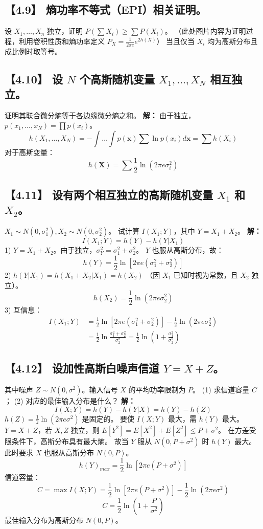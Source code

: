 \documentclass[11pt, a4paper]{article}
\begin{document}
\subsection*{【4.9】 熵功率不等式（EPI）相关证明。}
设 $X_1, \dots, X_n$ 独立，证明 $P(\sum X_i) \ge \sum P(X_i)$。
（此处图片内容为证明过程，利用卷积性质和熵功率定义 $P_X = \frac{1}{2\pi e} e^{2h(X)}$）
当且仅当 $X_i$ 均为高斯分布且成比例时取等号。

\subsection*{【4.10】 设 $N$ 个高斯随机变量 $X_1, \dots, X_N$ 相互独立。}
证明其联合微分熵等于各边缘微分熵之和。
\textbf{解：}
由于独立，$p(x_1, \dots, x_N) = \prod p(x_i)$。
\[ h(X_1, \dots, X_N) = - \int \dots \int p(\mathbf{x}) \sum \ln p(x_i) d\mathbf{x} = \sum h(X_i) \]
对于高斯变量：
\[ h(\mathbf{X}) = \sum \frac{1}{2} \ln(2\pi e \sigma_i^2) \]

\subsection*{【4.11】 设有两个相互独立的高斯随机变量 $X_1$ 和 $X_2$。}
$X_1 \sim N(0, \sigma_1^2), X_2 \sim N(0, \sigma_2^2)$。
试计算 $I(X_1; Y)$，其中 $Y = X_1 + X_2$。
\textbf{解：}
\[ I(X_1; Y) = h(Y) - h(Y|X_1) \]
1) $Y = X_1 + X_2$。由于独立，$\sigma_Y^2 = \sigma_1^2 + \sigma_2^2$。
$Y$ 也服从高斯分布，故：
\[ h(Y) = \frac{1}{2} \ln [2\pi e (\sigma_1^2 + \sigma_2^2)] \]
2) $h(Y|X_1) = h(X_1 + X_2 | X_1) = h(X_2)$ （因 $X_1$ 已知时视为常数，且 $X_2$ 独立）。
\[ h(X_2) = \frac{1}{2} \ln (2\pi e \sigma_2^2) \]
3) 互信息：
\[
\begin{aligned}
I(X_1; Y) &= \frac{1}{2} \ln [2\pi e (\sigma_1^2 + \sigma_2^2)] - \frac{1}{2} \ln (2\pi e \sigma_2^2) \\
&= \frac{1}{2} \ln \frac{\sigma_1^2 + \sigma_2^2}{\sigma_2^2} = \frac{1}{2} \ln \left( 1 + \frac{\sigma_1^2}{\sigma_2^2} \right)
\end{aligned}
\]

\subsection*{【4.12】 设加性高斯白噪声信道 $Y = X + Z$。}
其中噪声 $Z \sim N(0, \sigma^2)$。输入信号 $X$ 的平均功率限制为 $P$。
(1) 求信道容量 $C$；
(2) 对应的最佳输入分布是什么？
\textbf{解：}
\[ I(X;Y) = h(Y) - h(Y|X) = h(Y) - h(Z) \]
$h(Z) = \frac{1}{2} \ln(2\pi e \sigma^2)$ 是固定的。
要使 $I(X;Y)$ 最大，需 $h(Y)$ 最大。
$Y = X + Z$，若 $X, Z$ 独立，则 $E[Y^2] = E[X^2] + E[Z^2] \le P + \sigma^2$。
在方差受限条件下，高斯分布具有最大熵。
故当 $Y$ 服从 $N(0, P+\sigma^2)$ 时 $h(Y)$ 最大。
此时要求 $X$ 也服从高斯分布 $N(0, P)$。
\[ h(Y)_{max} = \frac{1}{2} \ln [2\pi e (P + \sigma^2)] \]
信道容量：
\[ C = \max I(X;Y) = \frac{1}{2} \ln [2\pi e (P + \sigma^2)] - \frac{1}{2} \ln(2\pi e \sigma^2) \]
\[ C = \frac{1}{2} \ln \left( 1 + \frac{P}{\sigma^2} \right) \]
最佳输入分布为高斯分布 $N(0, P)$。
\end{document}
